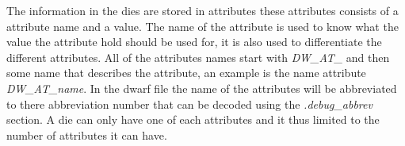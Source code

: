  


The information in the \glspl{die} are stored in attributes these attributes consists of a attribute name and a value.
The name of the attribute is used to know what the value the attribute hold should be used for, it is also used to differentiate the different attributes.
All of the attributes names start with \emph{DW\_AT\_} and then some name that describes the attribute, an example is the name attribute \emph{DW\_AT\_name}.
In the dwarf file the name of the attributes will be abbreviated to there abbreviation number that can be decoded using the \emph{.debug\_abbrev} section.
A die can only have one of each attributes and it thus limited to the number of attributes it can have.

